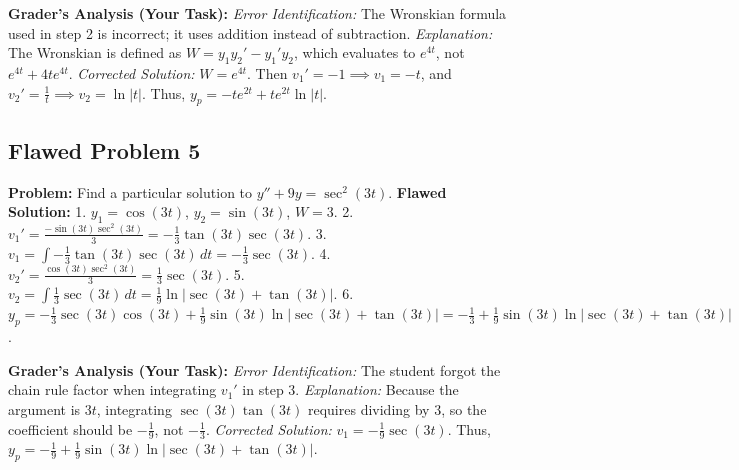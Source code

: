 \documentclass{article}
\begin{document}
\textbf{Grader's Analysis (Your Task):}
\textit{Error Identification:} The Wronskian formula used in step 2 is incorrect; it uses addition instead of subtraction.
\textit{Explanation:} The Wronskian is defined as $W = y_1 y_2' - y_1' y_2$, which evaluates to $e^{4t}$, not $e^{4t} + 4t e^{4t}$.
\textit{Corrected Solution:} $W = e^{4t}$. Then $v_1' = -1 \implies v_1 = -t$, and $v_2' = \frac{1}{t} \implies v_2 = \ln|t|$. Thus, $y_p = -t e^{2t} + t e^{2t} \ln|t|$.

\subsection{Flawed Problem 5}
\textbf{Problem:} Find a particular solution to $y'' + 9y = \sec^2(3t)$.
\textbf{Flawed Solution:}
1. $y_1 = \cos(3t)$, $y_2 = \sin(3t)$, $W = 3$.
2. $v_1' = \frac{-\sin(3t) \sec^2(3t)}{3} = -\frac{1}{3} \tan(3t) \sec(3t)$.
3. $v_1 = \int -\frac{1}{3} \tan(3t) \sec(3t) \, dt = -\frac{1}{3} \sec(3t)$.
4. $v_2' = \frac{\cos(3t) \sec^2(3t)}{3} = \frac{1}{3} \sec(3t)$.
5. $v_2 = \int \frac{1}{3} \sec(3t) \, dt = \frac{1}{9} \ln\left|\sec(3t) + \tan(3t)\right|$.
6. $y_p = -\frac{1}{3} \sec(3t) \cos(3t) + \frac{1}{9} \sin(3t) \ln\left|\sec(3t) + \tan(3t)\right| = -\frac{1}{3} + \frac{1}{9} \sin(3t) \ln\left|\sec(3t) + \tan(3t)\right|$.

\textbf{Grader's Analysis (Your Task):}
\textit{Error Identification:} The student forgot the chain rule factor when integrating $v_1'$ in step 3.
\textit{Explanation:} Because the argument is $3t$, integrating $\sec(3t)\tan(3t)$ requires dividing by $3$, so the coefficient should be $-\frac{1}{9}$, not $-\frac{1}{3}$.
\textit{Corrected Solution:} $v_1 = -\frac{1}{9} \sec(3t)$. Thus, $y_p = -\frac{1}{9} + \frac{1}{9} \sin(3t) \ln\left|\sec(3t) + \tan(3t)\right|$.
\end{document}
